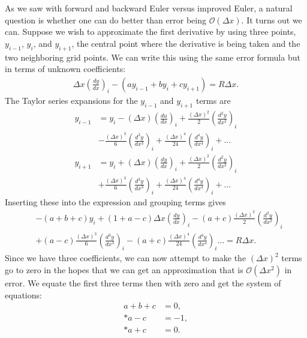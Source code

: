 As we saw with forward and backward Euler versus improved Euler, a natural question is whether one can do better than error being $\mathcal{O}(\Delta x)$. It turns out we can. Suppose we wish to approximate the first derivative by using three points, $y_{i-1}$, $y_i$, and $y_{i+1}$, the central point where the derivative is being taken and the two neighboring grid points. We can write this using the same error formula but in terms of unknown coefficients:
\begin{align}
  \Delta x  \left( \frac{dy}{dx} \right)_i - \left( a y_{i-1} + b y_i + c y_{i+1} \right) = R \Delta x .
\end{align}
The Taylor series expansions for the $y_{i-1}$ and $y_{i+1}$ terms are
\begin{subequations}
\begin{align}
  y_{i-1} &= y_i - (\Delta x) \left( \frac{du}{dx} \right)_i + \frac{(\Delta x)^2}{2} \left( \frac{d^2 y}{dx^2} \right)_i \nonumber \\
  		  &- \frac{(\Delta x)^3}{6} \left( \frac{d^3 y}{dx^3} \right)_i + \frac{(\Delta x)^4}{24} \left( \frac{d^4 y}{dx^4} \right)_i + \ldots \\ 
  y_{i+1} &= y_i + (\Delta x) \left( \frac{dy}{dx} \right)_i + \frac{(\Delta x)^2}{2} \left( \frac{d^2 y}{dx^2} \right)_i \nonumber \\
  		  &+ \frac{(\Delta x)^3}{6} \left( \frac{d^3 y}{dx^3} \right)_i + \frac{(\Delta x)^4}{24} \left( \frac{d^4 y}{dx^4} \right)_i + \ldots
\end{align}
\end{subequations}
Inserting these into the expression and grouping terms gives
\begin{align}
  &-( a + b + c ) y_i + ( 1 + a - c ) \Delta x  \left( \frac{dy}{dx} \right)_i - ( a + c ) \frac{(\Delta x)^2}{2} \left( \frac{d^2 y}{dx^2} \right)_i \nonumber \\ 
  & + ( a - c ) \frac{(\Delta x)^3}{6} \left( \frac{d^3 y}{dx^3} \right)_i  - ( a + c ) \frac{(\Delta x)^4}{24} \left( \frac{d^4 y}{dx^4} \right)_i  \ldots = R \Delta x.
\end{align}
Since we have three coefficients, we can now attempt to make the $(\Delta x)^2$ terms go to zero in the hopes that we can get an approximation that is $\mathcal{O}( \Delta x^2 )$ in error. We equate the first three terms then with zero and get the system of equations:
\begin{subequations}
\begin{align}
  a + b + c &= 0, \\*
  a - c &= -1, \\*
  a + c &= 0.
\end{align}
\end{subequations}
